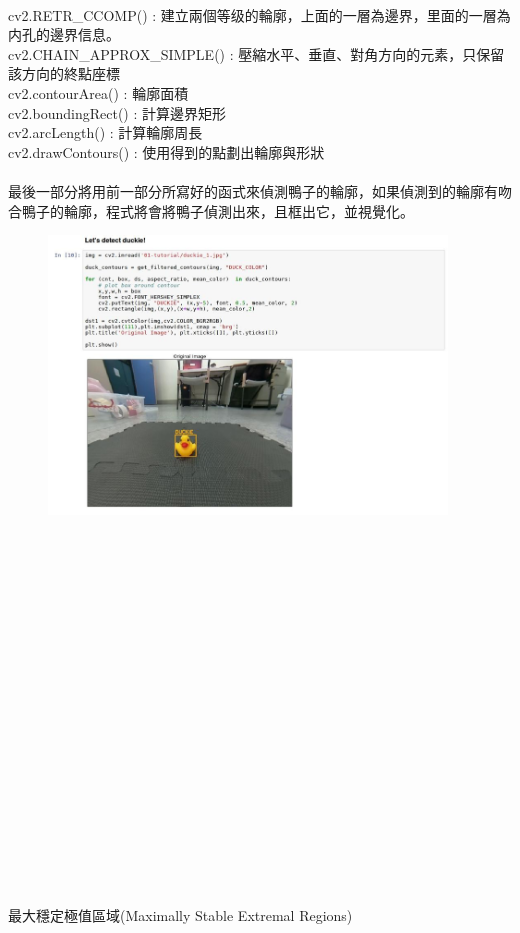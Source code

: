 \documentclass{article}
\begin{document}
\\cv2.RETR\_CCOMP()		: 建立兩個等级的輪廓，上面的一層為邊界，里面的一層為内孔的邊界信息。
\\cv2.CHAIN\_APPROX\_SIMPLE()	: 壓縮水平、垂直、對角方向的元素，只保留該方向的終點座標
\\cv2.contourArea()			: 輪廓面積
\\cv2.boundingRect()			: 計算邊界矩形
\\cv2.arcLength()			: 計算輪廓周長
\\cv2.drawContours()			: 使用得到的點劃出輪廓與形狀
\\\\最後一部分將用前一部分所寫好的函式來偵測鴨子的輪廓，如果偵測到的輪廓有吻合鴨子的輪廓，程式將會將鴨子偵測出來，且框出它，並視覺化。
\begin{figure}[htp]
    \begin{center}
        \includegraphics[width=300pt]{pic/5_1_6.png}
    \end{center}
\end{figure}
\\
\\\\\\\\\\\\\\\\\\\\\\\\\\\\\\\\\\\\最大穩定極值區域(Maximally Stable Extremal Regions)
\end{document}
